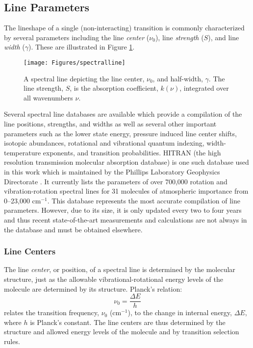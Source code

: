 \documentclass[11pt]{article}
\begin{document}
\subsection{Line Parameters}\label{sec:lines}

The lineshape of a single (non-interacting) transition is commonly 
characterized by several parameters including the line {\it center} 
($\nu_0$), 
line {\it strength} ($S$), and line {\it width} ($\gamma$).  These are
illustrated in Figure \ref{fig:spectralline}.
\begin{figure}
  \begin{center}
  \texttt{[image: Figures/spectralline]}
  \end{center}
  \caption[A spectral line depicting the line center and line width.]
	{A spectral line depicting the line center, $\nu_0$, and half-width,
	$\gamma$.  The line strength, $S$, is the absorption coefficient,
	$k(\nu)$, integrated over all wavenumbers $\nu$.}
  \label{fig:spectralline}
\end{figure}

Several spectral line databases are available which provide a compilation
of the line positions, strengths, and widths as well as several other
important parameters such as the lower state energy, pressure induced line
center shifts, isotopic abundances, rotational and vibrational quantum
indexing, width-temperature exponents, and transition probabilities.
HITRAN\cite{rot:87,rot:92} 
(the high resolution transmission molecular absorption database) 
is one such database used in this work which is maintained by the Phillips 
Laboratory Geophysics Directorate .  It currently lists the
parameters of over 700,000 rotation and vibration-rotation spectral lines
for 31 molecules of atmospheric importance from 0--23,000 cm$^{-1}$.
This database represents the most accurate compilation of line parameters.
However, due to its size, it is only updated every two to four years and 
thus recent
state-of-the-art measurements and calculations are not always in the
database and must be obtained elsewhere.

\subsubsection{Line Centers}

The line {\it center}, or position, of a spectral line is determined by the
molecular structure, just as the allowable vibrational-rotational energy
levels of the molecule are determined by its structure.  Planck's relation: 
\begin{equation}
\nu_{0}=\frac{\Delta E}{h}
\end{equation}
relates the transition frequency, $\nu_{0}$ (cm$^{-1}$), to the 
change in internal energy, $\Delta E$, where $h$ is Planck's constant.  
The line centers are thus determined by the structure and allowed energy
levels of the molecule and by transition selection rules. 
\end{document}
